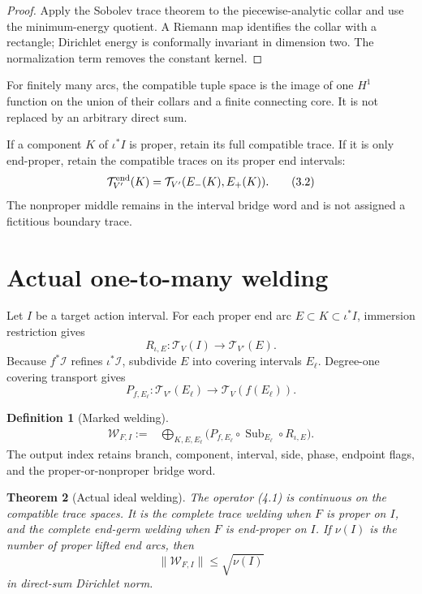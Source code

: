 \documentclass[11pt]{article}
\newtheorem{theorem}{Theorem}[section]
\theoremstyle{definition}
\newtheorem{definition}[theorem]{Definition}
\theoremstyle{remark}
\newcommand{\Sub}{\operatorname{Sub}}
\begin{document}
\begin{proof}
Apply the Sobolev trace theorem to the piecewise-analytic collar and use the
minimum-energy quotient.  A Riemann map identifies the collar with a rectangle;
Dirichlet energy is conformally invariant in dimension two.  The normalization
term removes the constant kernel.
\end{proof}

For finitely many arcs, the compatible tuple space is the image of one
$H^1$ function on the union of their collars and a finite connecting core.  It
is not replaced by an arbitrary direct sum.

If a component $K$ of $\iota^*I$ is proper, retain its full compatible trace.
If it is only end-proper, retain the compatible traces on its proper end
intervals:
\[
 \mathcal T_{V'}^{\rm end}(K)
 =\mathcal T_{V'}(E_-(K),E_+(K)).
 \tag{3.2}
\]
The nonproper middle remains in the interval bridge word and is not assigned a
fictitious boundary trace.

\section{Actual one-to-many welding}
Let $I$ be a target action interval.  For each proper end arc
$E\subset K\subset\iota^*I$, immersion restriction gives
\[
 R_{\iota,E}:\mathcal T_V(I)\longrightarrow\mathcal T_{V'}(E).
\]
Because $f^*\mathcal I$ refines $\iota^*\mathcal I$, subdivide $E$ into
covering intervals $E_\ell$.  Degree-one covering transport gives
\[
 P_{f,E_\ell}:\mathcal T_{V'}(E_\ell)
 \longrightarrow\mathcal T_V(f(E_\ell)).
\]

\begin{definition}[Marked welding]
\[
 \begin{aligned}
 \mathcal W_{F,I}:={}&
 \bigoplus_{K,E,E_\ell}
 \bigl(P_{f,E_\ell}\circ\Sub_{E_\ell}\circ R_{\iota,E}\bigr).
 \end{aligned}
 \tag{4.1}
\]
The output index retains branch, component, interval, side, phase, endpoint
flags, and the proper-or-nonproper bridge word.
\end{definition}

\begin{theorem}[Actual ideal welding]
The operator (4.1) is continuous on the compatible trace spaces.  It is the
complete trace welding when $F$ is proper on $I$, and the complete end-germ
welding when $F$ is end-proper on $I$.  If $\nu(I)$ is the number of proper
lifted end arcs, then
\[
 \|\mathcal W_{F,I}\|\le\sqrt{\nu(I)}
 \tag{4.2}
\]
in direct-sum Dirichlet norm.
\end{theorem}
\end{document}
